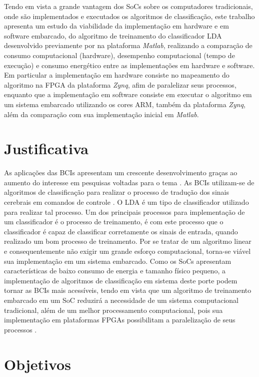 Tendo em vista a grande vantagem dos SoCs sobre os computadores tradicionais, onde são implementados e executados os algoritmos de classificação, este trabalho apresenta um estudo da viabilidade da implementação em hardware e em software embarcado, do algoritmo de treinamento do classificador LDA desenvolvido previamente por \cite{F.Lotte} na plataforma \textit{Matlab}, realizando a comparação de consumo computacional (hardware), desempenho computacional (tempo de execução) e consumo energético entre as implementações em hardware e software. Em particular a implementação em hardware consiste no mapeamento do algoritmo na FPGA da plataforma \textit{Zynq}, afim de paralelizar seus processos, enquanto que a implementação em software consiste em executar o algoritmo em um sistema embarcado utilizando os cores ARM, também da plataforma \textit{Zynq}, além da comparação com sua implementação inicial em \textit{Matlab}.


\section{Justificativa}
As aplicações das BCIs apresentam um crescente desenvolvimento  graças ao aumento do interesse em pesquisas voltadas para o tema \cite{BCICompetition} . As BCIs utilizam-se de algoritmos de classificação para realizar o processo de tradução dos sinais cerebrais em comandos de controle \cite{MasonAndBirch}. O LDA é um tipo de classificador utilizado para realizar tal processo. Um dos principais processos para implementação de um classificador é o processo de treinamento, é com este processo que o classificador é capaz de classificar corretamente os sinais de entrada, quando realizado um bom processo de treinamento\cite{F.Lotte}. Por se tratar de um algoritmo linear e consequentemente não exigir um grande esforço computacional, torna-se viável sua implementação em um sistema embarcado. Como os SoCs apresentam características de baixo consumo de energia e tamanho físico pequeno, a implementação de algoritmos de classificação em sistema deste porte podem tornar as BCIs mais acessíveis, tendo em vista que um algoritmo de treinamento embarcado em um SoC reduzirá a necessidade de um sistema computacional tradicional, além de um melhor processamento computacional, pois sua implementação em plataformas FPGAs possibilitam a paralelização de seus processos \cite{zynqBook}.

\section{Objetivos}

